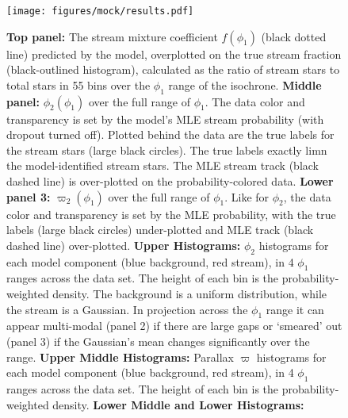 \documentclass[twocolumn]{aastex631}
\begin{document}
        \begin{figure}
            \centering
            \texttt{[image: figures/mock/results.pdf]}
            \caption{
                \textbf{Top panel:}%
                    The stream mixture coefficient $f(\phi_1)$ (black dotted line)
                    predicted by the model, overplotted on the true stream fraction
                    (black-outlined histogram), calculated as the ratio of stream
                    stars to total stars in 55 bins over the $\phi_1$ range of the
                    isochrone.  \textbf{Middle panel: }%
                    $\phi_2(\phi_1)$ over the full range of $\phi_1$. The data color
                    and transparency is set by the model's MLE stream probability
                    (with dropout turned off). Plotted behind the data are the true
                    labels for the stream stars (large black circles).  The true
                    labels exactly limn the model-identified stream stars.  The MLE
                    stream track (black dashed line) is over-plotted on the
                    probability-colored data.
                \textbf{Lower panel 3: }%
                    $\varpi_2(\phi_1)$ over the full range of $\phi_1$. Like for
                    $\phi_2$, the data color and transparency is set by the MLE
                    probability, with the true labels (large black circles)
                    under-plotted and MLE track (black dashed line) over-plotted.
                \textbf{Upper Histograms: }%
                    $\phi_2$ histograms for each model component (blue background,
                    red stream), in 4 $\phi_1$ ranges across the data set.  The
                    height of each bin is the probability-weighted density.  The
                    background is a uniform distribution, while the stream is a
                    Gaussian. In projection across the $\phi_1$ range it can appear
                    multi-modal (panel 2) if there are large gaps or `smeared' out
                    (panel 3) if the Gaussian's mean changes significantly over the range.
                \textbf{Upper Middle Histograms: }%
                    Parallax $\varpi$ histograms for each model component (blue
                    background, red stream), in 4 $\phi_1$ ranges across the data
                    set.  The height of each bin is the probability-weighted
                    density.
                \textbf{Lower Middle and Lower Histograms:}%
}
\end{figure}
\end{document}

